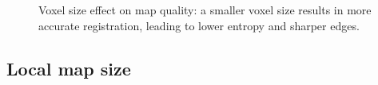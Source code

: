 \begin{figure}[h]
    \centering
    \hspace{1pt}
    \caption[Voxel size effect on map quality]{Voxel size effect on map quality: a smaller voxel size results in more accurate registration, leading to lower entropy and sharper edges.}
    \label{fig:voxel-size-mapping}
\end{figure}




\subsection{Local map size}


